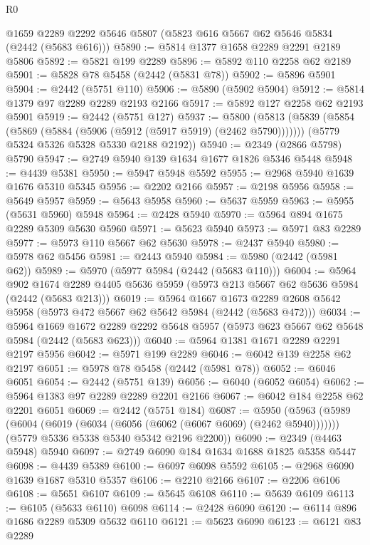 \begin{lexlean}{R0}
\begin{coremodule}
    @1659
    @2289
    @2292
    @5646
    @5807
    (@5823 @616 @5667 @62 @5646 @5834 (@2442 (@5683 @616)))
@5890 := @5814 @1377 @1658 @2289 @2291 @2189 @5806
@5892 := @5821 @199 @2289
@5896 := @5892 @110 @2258 @62 @2189
@5901 := @5828 @78 @5458 (@2442 (@5831 @78))
@5902 := @5896 @5901
@5904 := @2442 (@5751 @110)
@5906 := @5890 (@5902 @5904)
@5912 := @5814 @1379 @97 @2289 @2289 @2193 @2166
@5917 := @5892 @127 @2258 @62 @2193 @5901
@5919 := @2442 (@5751 @127)
@5937 := @5800
    (@5813
      (@5839 (@5854 (@5869 (@5884 (@5906 (@5912 (@5917 @5919) (@2462 @5790)))))))
      (@5779 @5324 @5326 @5328 @5330 @2188 @2192))
@5940 := @2349 (@2866 @5798) @5790
@5947 := @2749 @5940 @139 @1634 @1677 @1826 @5346 @5448
@5948 := @4439 @5381
@5950 := @5947 @5948 @5592
@5955 := @2968 @5940 @1639 @1676 @5310 @5345
@5956 := @2202 @2166
@5957 := @2198 @5956
@5958 := @5649 @5957
@5959 := @5643 @5958
@5960 := @5637 @5959
@5963 := @5955 (@5631 @5960) @5948
@5964 := @2428 @5940
@5970 := @5964 @894 @1675 @2289 @5309 @5630 @5960
@5971 := @5623 @5940
@5973 := @5971 @83 @2289
@5977 := @5973 @110 @5667 @62 @5630
@5978 := @2437 @5940
@5980 := @5978 @62 @5456
@5981 := @2443 @5940
@5984 := @5980 (@2442 (@5981 @62))
@5989 := @5970 (@5977 @5984 (@2442 (@5683 @110)))
@6004 := @5964
    @902
    @1674
    @2289
    @4405
    @5636
    @5959
    (@5973 @213 @5667 @62 @5636 @5984 (@2442 (@5683 @213)))
@6019 := @5964
    @1667
    @1673
    @2289
    @2608
    @5642
    @5958
    (@5973 @472 @5667 @62 @5642 @5984 (@2442 (@5683 @472)))
@6034 := @5964
    @1669
    @1672
    @2289
    @2292
    @5648
    @5957
    (@5973 @623 @5667 @62 @5648 @5984 (@2442 (@5683 @623)))
@6040 := @5964 @1381 @1671 @2289 @2291 @2197 @5956
@6042 := @5971 @199 @2289
@6046 := @6042 @139 @2258 @62 @2197
@6051 := @5978 @78 @5458 (@2442 (@5981 @78))
@6052 := @6046 @6051
@6054 := @2442 (@5751 @139)
@6056 := @6040 (@6052 @6054)
@6062 := @5964 @1383 @97 @2289 @2289 @2201 @2166
@6067 := @6042 @184 @2258 @62 @2201 @6051
@6069 := @2442 (@5751 @184)
@6087 := @5950
    (@5963
      (@5989 (@6004 (@6019 (@6034 (@6056 (@6062 (@6067 @6069) (@2462 @5940)))))))
      (@5779 @5336 @5338 @5340 @5342 @2196 @2200))
@6090 := @2349 (@4463 @5948) @5940
@6097 := @2749 @6090 @184 @1634 @1688 @1825 @5358 @5447
@6098 := @4439 @5389
@6100 := @6097 @6098 @5592
@6105 := @2968 @6090 @1639 @1687 @5310 @5357
@6106 := @2210 @2166
@6107 := @2206 @6106
@6108 := @5651 @6107
@6109 := @5645 @6108
@6110 := @5639 @6109
@6113 := @6105 (@5633 @6110) @6098
@6114 := @2428 @6090
@6120 := @6114 @896 @1686 @2289 @5309 @5632 @6110
@6121 := @5623 @6090
@6123 := @6121 @83 @2289

\end{coremodule}
\end{lexlean}
